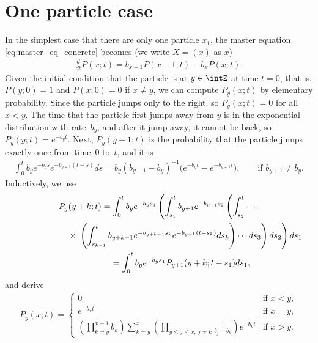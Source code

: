 \section{One particle case} \label{sec:1pt}

In the simplest case that there are only one particle $x_1$, the master equation \eqref{eq:master_eq_concrete} becomes (we write $X = (x)$ as $x$)
\begin{gather*} %
 \frac{d}{dt} P(x; t) = b_{x - 1} P(x - 1; t) - b_{x} P(x; t).
\end{gather*}
Given the initial condition that the particle is at $y \in \intZ$ at time $t = 0$, that is, $P(y; 0) = 1$ and $P(x; 0) = 0$ if $x \neq y$, we can compute $P_y(x; t)$ by elementary probability. Since the particle jumps only to the right, so $P_y(x; t) = 0$ for all $x < y$. The time that the particle f\/irst jumps away from $y$ is in the exponential distribution with rate~$b_y$, and after it jump away, it cannot be back, so $P_y(y; t) = e^{-b_y t}$. Next, $P_y(y + 1; t)$ is the probability that the particle jumps exactly once from time~$0$ to~$t$, and it is
\begin{gather*}
 \int^t_0 b_y e^{-b_y s} e^{-b_{y + 1} (t - s)} ds = b_y (b_{y + 1} - b_y)^{-1} \big(e^{-b_y t} - e^{-b_{y + 1} t}\big), \qquad \text{if $b_{y + 1} \neq b_y$}.
\end{gather*}
Inductively, we use
\begin{gather*}
 P_y(y + k; t) =   \int^t_0 b_y e^{-b_y s_1} \left( \int^t_{s_1} b_{y + 1} e^{-b_{y + 1} s_2} \left( \int^t_{s_2} \dotsb \vphantom{\int^t_{s_{k - 1}}} \right. \right. \\
\hphantom{P_y(y + k; t) =}{} \times \left. \left. \left( \int^t_{s_{k - 1}} b_{y + k - 1} e^{-b_{y + k - 1} s_k} e^{-b_{y + k} (t - s_k)} ds_k \right) \dotsb ds_3 \right) ds_2 \right) ds_1 \\
\hphantom{P_y(y + k; t)}{} =  \int^t_0 b_y e^{-b_y s_1} P_{y + 1}(y + k; t - s_1) ds_1,
\end{gather*}
and derive
\begin{gather*}
 P_y(x; t) =
 \begin{cases}
 0 & \text{if $x < y$}, \\
 e^{-b_x t} & \text{if $x = y$}, \\
 \displaystyle \left( \prod^{x - 1}_{k = y} b_k \right) \sum^x_{k = y} \left( \prod_{y \leq j \leq x,\ j \neq k} \frac{1}{b_j - b_k} \right) e^{-b_k t} & \text{if $x > y$}.
 \end{cases}
\end{gather*}
